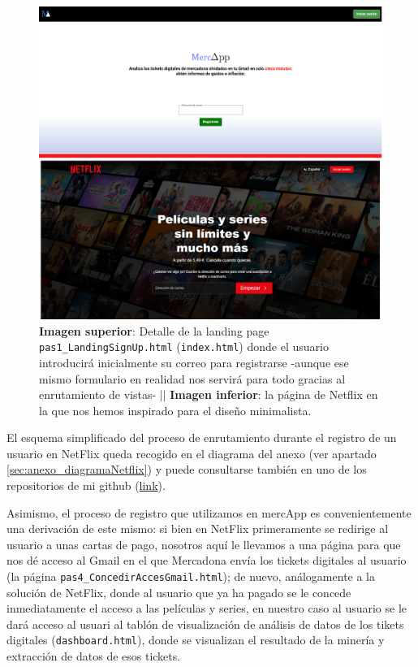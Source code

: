 \documentclass[a4paper,12pt]{report}
\begin{document}
	\setlength{\belowcaptionskip}{3pt}
	\FloatBarrier
	\begin{figure}[H]
		\centering
		\caption{\textbf{Imagen superior}: Detalle de la landing page \texttt{pas1\_LandingSignUp.html} (\texttt{index.html}) donde el usuario introducirá inicialmente su correo para registrarse -aunque ese mismo formulario en realidad nos servirá para todo gracias al enrutamiento de vistas- $||$ \textbf{Imagen inferior}: la página de Netflix en la que nos hemos inspirado para el diseño minimalista.}
		\includegraphics[width=1\textwidth]{img/landingSignUp.png}

		\label{fig:landingSignUpDETALL} 
	\end{figure}
	\FloatBarrier
	
	El esquema simplificado del proceso de enrutamiento durante el registro de un usuario en NetFlix queda recogido en el diagrama del anexo (ver apartado \ref{sec:anexo_diagramaNetflix}) y puede consultarse también en uno de los repositorios de mi github (\href{https://www.github.com/miApp}{link}). 
	
	Asimismo, el proceso de registro que utilizamos en mercApp es convenientemente una derivación de este mismo: si bien en NetFlix primeramente se redirige al usuario a unas cartas de pago, nosotros aquí le llevamos a una página para que nos dé acceso al Gmail en el que Mercadona envía los tickets digitales al usuario (la página  \texttt{pas4\_ConcedirAccesGmail.html}); de nuevo, análogamente a la solución de NetFlix, donde al usuario que ya ha pagado se le concede inmediatamente el acceso a las películas y series,  en nuestro caso al usuario se le dará acceso al usuari al tablón de visualización de análisis de datos de los tikets digitales  (\texttt{dashboard.html}), donde se visualizan el resultado de la minería y extracción de datos de esos tickets. 
	
\end{document}
